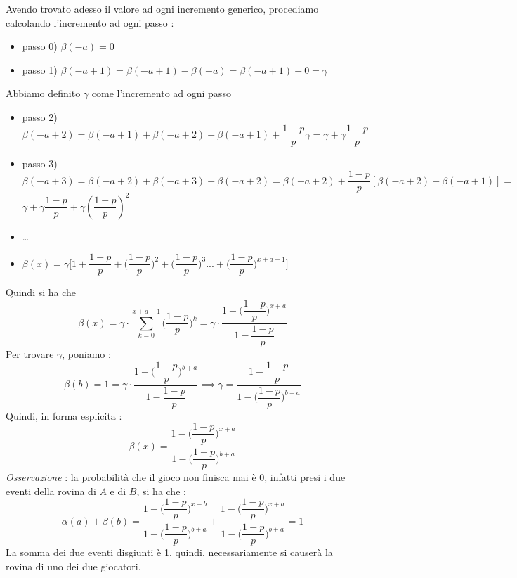 \documentclass[12pt, letterpaper]{article}
\begin{document}
Avendo trovato adesso il valore ad ogni incremento generico, procediamo calcolando l'incremento ad ogni passo :
\begin{itemize}
    \item passo 0) \(\beta(-a)=0\)
    \item passo 1)  \(\beta(-a+1)=\beta(-a+1)-\beta(-a)=\beta(-a+1)-0=\gamma\) 
\end{itemize}
Abbiamo definito \(\gamma\) come l'incremento ad ogni passo \begin{itemize}
    \item passo 2) \(\beta(-a+2) =\beta(-a+1)+\beta(-a+2)-\beta(-a+1)+\dfrac{1-p}{p}\gamma=\gamma+\gamma\dfrac{1-p}{p} \)
    \item passo 3) \(\beta(-a+3)=\beta(-a+2)+\beta(-a+3)-\beta(-a+2)=\beta(-a+2)+\dfrac{1-p}{p}[\beta(-a+2)-\beta(-a+1)]=\)\\
    \(\gamma+\gamma\dfrac{1-p}{p}+\gamma(\dfrac{1-p}{p})^2\)
    \item \dots
    \item \(\beta(x)=\gamma\Big[1+\dfrac{1-p}{p}+\Big(\dfrac{1-p}{p}\Big)^2+\Big(\dfrac{1-p}{p}\Big)^3...+\Big(\dfrac{1-p}{p}\Big)^{x+a-1}\Big]\)
\end{itemize}
Quindi si ha che \begin{equation}
    \beta(x)=\gamma\cdot \sum_{k=0}^{x+a-1}\Big(\dfrac{1-p}{p}\Big)^k=\gamma\cdot\dfrac{1-\Big(\dfrac{1-p}{p}\Big)^{x+a}}{1-\dfrac{1-p}{p}}
\end{equation}
Per trovare \(\gamma\), poniamo :
\begin{equation}
    \beta(b)=1=\gamma\cdot\dfrac{1-\Big(\dfrac{1-p}{p}\Big)^{b+a}}{1-\dfrac{1-p}{p}}\implies \gamma =\dfrac{1-\dfrac{1-p}{p}}{1-\Big(\dfrac{1-p}{p}\Big)^{b+a}}
\end{equation}
Quindi, in forma esplicita :\begin{equation}
    \beta(x)=\dfrac{1-\Big(\dfrac{1-p}{p}\Big)^{x+a}}{1-\Big(\dfrac{1-p}{p}\Big)^{b+a}}
\end{equation}
\textit{Osservazione }: la probabilità che il gioco non finisca mai è 0, infatti presi i due eventi della rovina 
di \(A\) e di \(B\), si ha che :\begin{equation}
    \alpha(a)+\beta(b)=\dfrac{1-\Big(\dfrac{1-p}{p}\Big)^{x+b}}{1-\Big(\dfrac{1-p}{p}\Big)^{b+a}}+\dfrac{1-\Big(\dfrac{1-p}{p}\Big)^{x+a}}{1-\Big(\dfrac{1-p}{p}\Big)^{b+a}}=1
\end{equation}
La somma dei due eventi disgiunti è 1, quindi, necessariamente si causerà la rovina di uno dei due giocatori.
\end{document}
